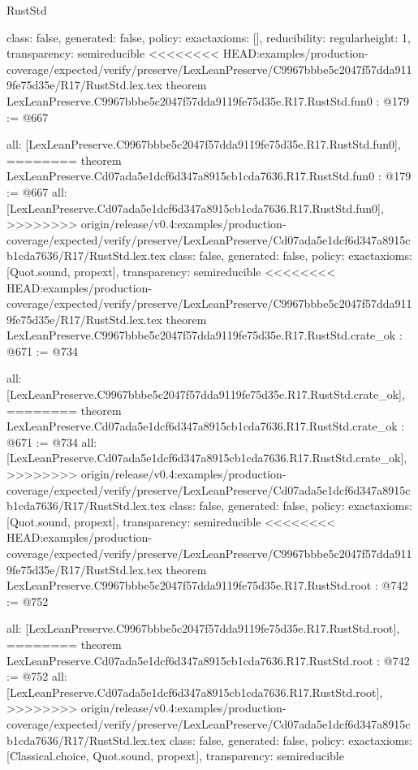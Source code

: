 \begin{lexlean}{RustStd}
\begin{coremodule}
{\begin{coremodule}
{{{  class: false,
  generated: false,
  policy: exact{axioms: []},
  reducibility: regular{height: 1},
  transparency: semireducible
}
<<<<<<<< HEAD:examples/production-coverage/expected/verify/preserve/LexLeanPreserve/C9967bbbe5c2047f57dda9119fe75d35e/R17/RustStd.lex.tex
theorem LexLeanPreserve.C9967bbbe5c2047f57dda9119fe75d35e.R17.RustStd.fun0 : @179 := @667 {
  all: [LexLeanPreserve.C9967bbbe5c2047f57dda9119fe75d35e.R17.RustStd.fun0],
========
theorem LexLeanPreserve.Cd07ada5e1dcf6d347a8915cb1cda7636.R17.RustStd.fun0 : @179 := @667 {
  all: [LexLeanPreserve.Cd07ada5e1dcf6d347a8915cb1cda7636.R17.RustStd.fun0],
>>>>>>>> origin/release/v0.4:examples/production-coverage/expected/verify/preserve/LexLeanPreserve/Cd07ada5e1dcf6d347a8915cb1cda7636/R17/RustStd.lex.tex
  class: false,
  generated: false,
  policy: exact{axioms: [Quot.sound, propext]},
  transparency: semireducible
}
<<<<<<<< HEAD:examples/production-coverage/expected/verify/preserve/LexLeanPreserve/C9967bbbe5c2047f57dda9119fe75d35e/R17/RustStd.lex.tex
theorem LexLeanPreserve.C9967bbbe5c2047f57dda9119fe75d35e.R17.RustStd.crate_ok : @671 := @734 {
  all: [LexLeanPreserve.C9967bbbe5c2047f57dda9119fe75d35e.R17.RustStd.crate_ok],
========
theorem LexLeanPreserve.Cd07ada5e1dcf6d347a8915cb1cda7636.R17.RustStd.crate_ok : @671 := @734 {
  all: [LexLeanPreserve.Cd07ada5e1dcf6d347a8915cb1cda7636.R17.RustStd.crate_ok],
>>>>>>>> origin/release/v0.4:examples/production-coverage/expected/verify/preserve/LexLeanPreserve/Cd07ada5e1dcf6d347a8915cb1cda7636/R17/RustStd.lex.tex
  class: false,
  generated: false,
  policy: exact{axioms: [Quot.sound, propext]},
  transparency: semireducible
}
<<<<<<<< HEAD:examples/production-coverage/expected/verify/preserve/LexLeanPreserve/C9967bbbe5c2047f57dda9119fe75d35e/R17/RustStd.lex.tex
theorem LexLeanPreserve.C9967bbbe5c2047f57dda9119fe75d35e.R17.RustStd.root : @742 := @752 {
  all: [LexLeanPreserve.C9967bbbe5c2047f57dda9119fe75d35e.R17.RustStd.root],
========
theorem LexLeanPreserve.Cd07ada5e1dcf6d347a8915cb1cda7636.R17.RustStd.root : @742 := @752 {
  all: [LexLeanPreserve.Cd07ada5e1dcf6d347a8915cb1cda7636.R17.RustStd.root],
>>>>>>>> origin/release/v0.4:examples/production-coverage/expected/verify/preserve/LexLeanPreserve/Cd07ada5e1dcf6d347a8915cb1cda7636/R17/RustStd.lex.tex
  class: false,
  generated: false,
  policy: exact{axioms: [Classical.choice, Quot.sound, propext]},
  transparency: semireducible
}

}}}}}
\end{coremodule}}
\end{coremodule}
\end{lexlean}
